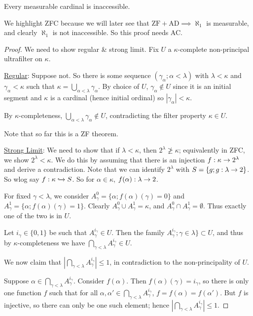 \documentclass[]{article}
\newcommand{\ad}{\textrm{AD}}
\newcommand{\zf}{\textrm{ZF}}
\begin{document}
\begin{theorem*} [ZFC]
    Every measurable cardinal is inaccessible.
\end{theorem*}
We highlight ZFC because we will later see that $\zf + \ad \implies \aleph_1$ is measurable, and clearly $\aleph_1$ is not inaccessible. So this proof needs AC.
\begin{proof}
    We need to show regular \& strong limit. Fix $U$ a $\kappa$-complete non-principal ultrafilter on $\kappa$.

    \underline{Regular}: Suppose not. So there is some sequence $(\gamma_\alpha; \alpha < \lambda)$ with $\lambda < \kappa$ and $\gamma_\alpha < \kappa$ such that $\kappa = \bigcup_{\alpha < \lambda}\gamma_\alpha$. By choice of $U$, $\gamma_\alpha \not\in U$ since it is an initial segment and $\kappa$ is a cardinal (hence initial ordinal) so $|\gamma_\alpha| < \kappa$.

    By $\kappa$-completeness, $\bigcup_{\alpha < \lambda}\gamma_\alpha \not\in U$, contradicting the filter property $\kappa \in U$.

    Note that so far this is a ZF theorem.

    \underline{Strong Limit}: We need to show that if $\lambda < \kappa$, then $2^\lambda \not\ge \kappa$; equivalently in ZFC, we show $2^\lambda < \kappa$. We do this by assuming that there is an injection $f : \kappa \rightarrow 2^\lambda$ and derive a contradiction. Note that we can identify $2^\lambda$ with $S = \{g; g : \lambda \rightarrow 2\}$. So wlog say $f : \kappa \xhookrightarrow{} S$. So for $\alpha \in \kappa$, $f(\alpha): \lambda \rightarrow 2$.

    For fixed $\gamma < \lambda$, we consider $A^0_\gamma = \{\alpha; f(\alpha)(\gamma) = 0\}$ and $A^1_\gamma = \{\alpha ; f(\alpha)(\gamma) = 1\}$. Clearly $A^0_\gamma \cup A^1_\gamma = \kappa$, and  $A^0_\gamma \cap A^1_\gamma = \emptyset$. Thus exactly one of the two is in $U$.

    Let $i_\gamma \in \{0,1\}$ be such that $A^{i_\gamma}_\gamma \in U$. Then the family $A^{i_\gamma}_\gamma;\gamma \in \lambda\}\subset U$, and thus by $\kappa$-completeness we have $\bigcap_{\gamma < \lambda}A^{i_\gamma}_\gamma \in U$.

    We now claim that $\left|\bigcap_{\gamma < \lambda}A^{i_\gamma}_\gamma \right| \le 1$, in contradiction to the non-principality of $U$.

    Suppose $\alpha \in \bigcap_{\gamma < \lambda}A^{i_\gamma}_\gamma$. Consider $f(\alpha)$. Then $f(\alpha)(\gamma) = i_\gamma$, so there is only one function $f$ such that for all $\alpha,\alpha' \in \bigcap_{\gamma < \lambda}A^{i_\gamma}_\gamma$, $f = f(\alpha) = f(\alpha')$. But $f$ is injective, so there can only be one such element; hence $\left|\bigcap_{\gamma < \lambda}A^{i_\gamma}_\gamma\right| \le 1$.
\end{proof}
\end{document}
